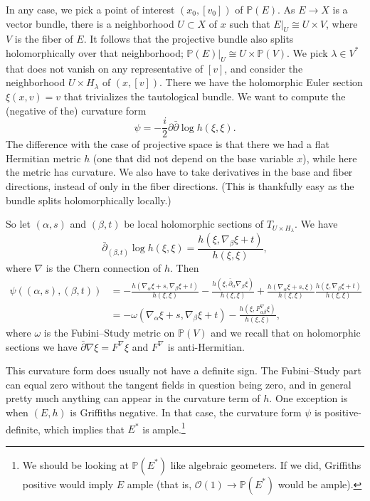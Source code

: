 \documentclass[11pt]{article}
\newcommand{\kk}[1]{\mathbb{#1}}
\newcommand{\cc}[1]{\mathcal{#1}}
\begin{document}
In any case, we pick a point of interest $(x_0, [v_0])$ of $\kk P(E)$. As $E \to X$ is a vector bundle, there is a neighborhood $U \subset X$ of $x$ such that $E|_U \cong U \times V$, where $V$ is the fiber of $E$. It follows that the projective bundle also splits holomorphically over that neighborhood; $\kk P(E)|_U \cong U \times \kk P(V)$. We pick $\lambda \in V^*$ that does not vanish on any representative of $[v]$, and consider the neighborhood $U \times H_\lambda$ of $(x, [v])$. There we have the holomorphic Euler section $\xi(x, v) = v$ that trivializes the tautological bundle. We want to compute the (negative of the) curvature form
$$
\psi = -\frac i2 \partial \bar\partial \log h(\xi, \xi).
$$
The difference with the case of projective space is that there we had a flat Hermitian metric $h$ (one that did not depend on the base variable $x$), while here the metric has curvature. We also have to take derivatives in the base and fiber directions, instead of only in the fiber directions. (This is thankfully easy as the bundle splits holomorphically locally.)

So let $(\alpha, s)$ and $(\beta, t)$ be local holomorphic sections of $T_{U \times H_\lambda}$. We have
$$
\bar\partial_{(\beta, t)} \log h(\xi,\xi)
= \frac{h(\xi, \nabla_\beta \xi + t)}{h(\xi,\xi)},
$$
where $\nabla$ is the Chern connection of $h$. Then
\begin{align*}
\psi((\alpha,s), (\beta,t))
&= -\frac{h(\nabla_\alpha \xi + s, \nabla_\beta \xi + t)}{h(\xi,\xi)}
- \frac{h(\xi, \bar\partial_\alpha \nabla_\beta \xi)}{h(\xi,\xi)}
+ \frac{h(\nabla_\alpha \xi + s, \xi)}{h(\xi,\xi)}
\frac{h(\xi, \nabla_\beta \xi + t)}{h(\xi,\xi)}
\\
&= -\omega(\nabla_\alpha \xi + s, \nabla_\beta \xi + t)
- \frac{h(\xi, F^\nabla_{\alpha\beta}\xi)}{h(\xi,\xi)},
\end{align*}
where $\omega$ is the Fubini--Study metric on $\kk P(V)$ and we recall that on holomorphic sections we have $\bar\partial \nabla \xi = F^\nabla \xi$ and $F^\nabla$ is anti-Hermitian.

This curvature form does usually not have a definite sign. The Fubini--Study part can equal zero without the tangent fields in question being zero, and in general pretty much anything can appear in the curvature term of $h$. One exception is when $(E,h)$ is Griffiths negative. In that case, the curvature form $\psi$ is positive-definite, which implies that $E^*$ is ample.\footnote{We should be looking at $\kk P(E^*)$ like algebraic geometers. If we did, Griffiths positive would imply $E$ ample (that is, $\cc O(1) \to \kk P(E^*)$ would be ample).}
\end{document}
